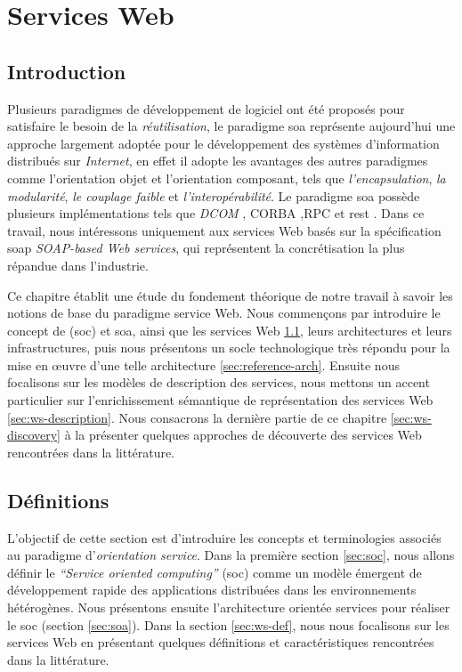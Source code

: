 \chapter{Services Web}
\label{ch:web-service}

\section*{Introduction}
 

Plusieurs paradigmes de développement de logiciel ont été proposés
pour satisfaire le besoin de la \textit{réutilisation}, le paradigme
\acrshort{soa} représente aujourd'hui une approche largement adoptée
pour le développement des systèmes d'information distribués sur
\textit{Internet}, en effet il adopte les avantages des autres
paradigmes comme l'orientation objet et l'orientation composant, tels
que \textit{l'encapsulation}, \textit{la modularité}, \textit{le
  couplage faible} et \textit{l'interopérabilité}. Le paradigme
\acrshort{soa} possède plusieurs implémentations tels que
\textit{DCOM} \cite{frank1997dcom}, \textsc{CORBA}
\cite{vinoski1997corba},\textsc{RPC} \cite{bloomer1992power} et
\acrshort{rest} \cite{fielding2000architectural}. Dans ce travail,
nous intéressons uniquement aux services Web basés sur la
spécification \acrshort{soap} \textit{SOAP-based Web services}, qui
représentent la concrétisation la plus répandue dans
l'industrie.\bigskip

Ce chapitre établit une étude du fondement théorique de notre travail
à savoir les notions de base du paradigme service Web. Nous commençons
par introduire le concept de (\acrshort{soc}) et \acrshort{soa}, ainsi
que les services Web \ref{sec:ws-definitions}, leurs architectures et
leurs infrastructures, puis nous présentons un socle technologique
très répondu pour la mise en œuvre d'une telle architecture
\ref{sec:reference-arch}. Ensuite nous focalisons sur les modèles de
description des services, nous mettons un accent particulier sur
l'enrichissement sémantique de représentation des services Web
\ref{sec:ws-description}. Nous consacrons la dernière partie de ce
chapitre \ref{sec:ws-discovery} à la présenter quelques approches de
découverte des services Web rencontrées dans la littérature.

\newpage
\section{Définitions}
\label{sec:ws-definitions}
L'objectif de cette section est d'introduire les concepts et
terminologies associés au paradigme d'\textit{orientation
  service}. Dans la première section \ref{sec:soc}, nous allons
définir le \textit{``Service oriented computing''} (\acrshort{soc})
comme un modèle émergent de développement rapide des applications
distribuées dans les environnements hétérogènes. Nous présentons
ensuite l'architecture orientée services pour réaliser le
\acrshort{soc} (section \ref{sec:soa}). Dans la section
\ref{sec:ws-def}, nous nous focalisons sur les services Web en
présentant quelques définitions et caractéristiques rencontrées dans
la littérature.

